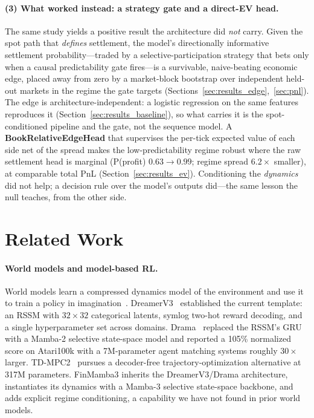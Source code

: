 \documentclass{article}
\begin{document}
\paragraph{(3) What worked instead: a strategy gate and a direct-EV head.}
The same study yields a positive result the architecture did \emph{not}
carry.  Given the spot path that \emph{defines} settlement, the model's
directionally informative settlement probability---traded by a
selective-participation strategy that bets only when a causal
predictability gate fires---is a survivable, naive-beating economic edge,
placed away from zero by a market-block bootstrap over independent held-out
markets in the regime the gate targets
(Sections~\ref{sec:results_edge},~\ref{sec:pnl}).  The edge is
architecture-independent: a logistic regression on the same features
reproduces it (Section~\ref{sec:results_baseline}), so what carries it is
the spot-conditioned pipeline and the gate, not the sequence model.  A
\textbf{BookRelativeEdgeHead} that supervises the per-tick expected value
of each side net of the spread makes the low-predictability regime robust
where the raw settlement head is marginal (P(profit) $0.63\!\to\!0.99$;
regime spread $6.2{\times}$ smaller), at comparable total PnL
(Section~\ref{sec:results_ev}).  Conditioning the \emph{dynamics} did not
help; a decision rule over the model's outputs did---the same lesson the
null teaches, from the other side.

\section{Related Work}\label{sec:related}

\paragraph{World models and model-based RL.}
World models learn a compressed dynamics model of the environment and
use it to train a policy in imagination~\citep{ha2018world}.
DreamerV3~\citep{hafner2023dreamerv3} established the current template:
an RSSM with $32\!\times\!32$ categorical latents, symlog two-hot reward
decoding, and a single hyperparameter set across domains.
Drama~\citep{wang2024drama} replaced the RSSM's GRU with a Mamba-2
selective state-space model and reported a 105\% normalized score on
Atari100k with a 7M-parameter agent matching systems roughly $30\times$
larger.  TD-MPC2~\citep{hansen2024tdmpc2} pursues a decoder-free
trajectory-optimization alternative at 317M parameters.  FinMamba3
inherits the DreamerV3/Drama architecture, instantiates its dynamics with
a Mamba-3 selective state-space backbone, and adds explicit regime
conditioning, a capability we have not found in prior world models.
\end{document}
